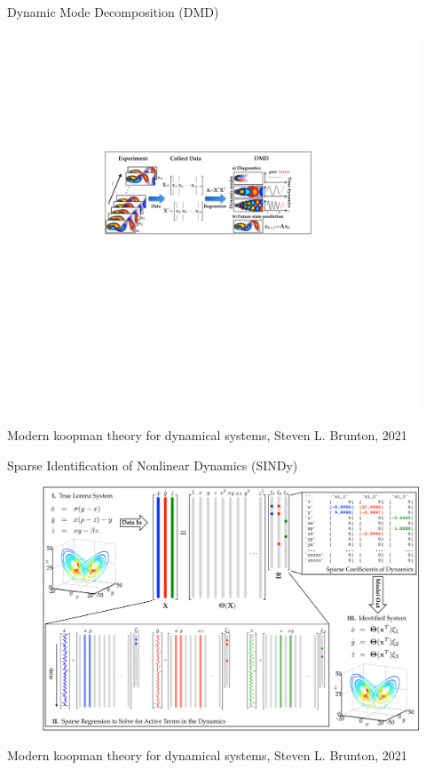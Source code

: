 \documentclass[aspectratio=169, handout, 10pt, hyperref=colorlinks]{beamer}
\begin{document}
\begin{frame}{Dynamic Mode Decomposition (DMD)}
    \begin{figure}
        \includegraphics[width=0.8\linewidth]{fig3p1.pdf}
        \caption{\cite{brunton2021modern}}
    \end{figure}
\begin{center}
\tiny{Modern koopman theory for dynamical systems, Steven L. Brunton, 2021}
\end{center}
\end{frame}
\begin{frame}{Sparse Identification of Nonlinear Dynamics (SINDy)}
    \begin{figure}
        \includegraphics[width=0.5\linewidth]{FIG00_BIG4.pdf}
        \caption{\cite{brunton2021modern}}
    \end{figure}
\begin{center}
\tiny{Modern koopman theory for dynamical systems, Steven L. Brunton, 2021}
\end{center}
\end{frame}
\end{document}
